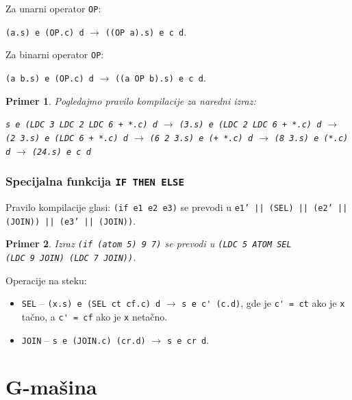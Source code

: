 \documentclass[a4paper]{article}
\newtheorem{primer}{Primer}[section]
\begin{document}
\noindent Za unarni operator \verb|OP|:
\begin{center}
	\verb|(a.s) e (OP.c) d| $\rightarrow$ \verb|((OP a).s) e c d|.
\end{center}

\noindent Za binarni operator \verb|OP|:
\begin{center}
	\verb|(a b.s) e (OP.c) d| $\rightarrow$ \verb|((a OP b).s) e c d|.
\end{center}

\begin{primer} Pogledajmo pravilo kompilacije za naredni izraz:
	\begin{center}
		\verb|s e (LDC 3 LDC 2 LDC 6 + *.c) d|
		$\rightarrow$ \verb|(3.s) e (LDC 2 LDC 6 + *.c) d|
		$\rightarrow$ \verb|(2 3.s) e (LDC 6 + *.c) d|
		$\rightarrow$ \verb|(6 2 3.s) e (+ *.c) d|
		$\rightarrow$ \verb|(8 3.s) e (*.c) d|
		$\rightarrow$ \verb|(24.s) e c d|
	\end{center}
\end{primer}

\subsubsection{Specijalna funkcija {\tt IF THEN ELSE}}

Pravilo kompilacije glasi: \verb|(if e1 e2 e3)| se prevodi u
\texttt{e1' || (SEL) || (e2' || (JOIN)) || (e3' || (JOIN))}.

\begin{primer}
	Izraz \verb|(if (atom 5) 9 7)| se prevodi u \verb|(LDC 5 ATOM SEL|\\
	\verb|(LDC 9 JOIN) (LDC 7 JOIN))|.
\end{primer}

Operacije na steku:
\begin{itemize}
	\item \verb|SEL| -- \verb|(x.s) e (SEL ct cf.c) d| $\rightarrow$ \verb|s e c' (c.d)|, gde je \verb|c' = ct| ako je \verb|x| tačno, a \verb|c' = cf| ako je \verb|x| netačno.
	
	\item \verb|JOIN| -- \verb|s e (JOIN.c) (cr.d)| $\rightarrow$ \verb|s e cr d|.\\
\end{itemize}



\section{G-mašina}
\label{sec:Gmasine}
\end{document}
